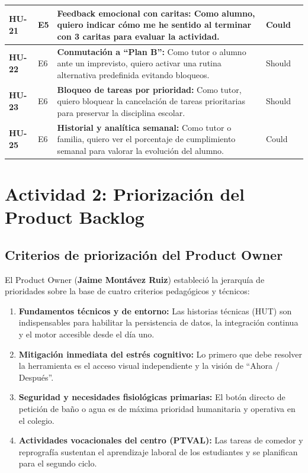 \documentclass[11pt,a4paper]{article}
\begin{document}
{\begin{longtable}{|>{\centering\bfseries\arraybackslash}p{1.3cm}|>{\centering\arraybackslash}p{1.1cm}|>{\raggedright\arraybackslash}p{7.4cm}|>{\centering\arraybackslash}p{1.6cm}|>{\centering\arraybackslash}p{0.8cm}|}
HU-21 & E5 & \textbf{Feedback emocional con caritas:} Como alumno, quiero indicar cómo me he sentido al terminar con 3 caritas para evaluar la actividad. & Could & 2 \\ \hline
HU-22 & E6 & \textbf{Conmutación a ``Plan B'':} Como tutor o alumno ante un imprevisto, quiero activar una rutina alternativa predefinida evitando bloqueos. & Should & 5 \\ \hline
HU-23 & E6 & \textbf{Bloqueo de tareas por prioridad:} Como tutor, quiero bloquear la cancelación de tareas prioritarias para preservar la disciplina escolar. & Should & 3 \\ \hline
HU-25 & E6 & \textbf{Historial y analítica semanal:} Como tutor o familia, quiero ver el porcentaje de cumplimiento semanal para valorar la evolución del alumno. & Could & 3 \\ \hline
\end{longtable}}

\section{Actividad 2: Priorización del Product Backlog}
\subsection{Criterios de priorización del Product Owner}
El Product Owner (\textbf{Jaime Montávez Ruiz}) estableció la jerarquía de prioridades sobre la base de cuatro criterios pedagógicos y técnicos:

\begin{enumerate}[leftmargin=1.6em,itemsep=2pt]
\item \textbf{Fundamentos técnicos y de entorno:} Las historias técnicas (HUT) son indispensables para habilitar la persistencia de datos, la integración continua y el motor accesible desde el día uno.
\item \textbf{Mitigación inmediata del estrés cognitivo:} Lo primero que debe resolver la herramienta es el acceso visual independiente y la visión de ``Ahora / Después''.
\item \textbf{Seguridad y necesidades fisiológicas primarias:} El botón directo de petición de baño o agua es de máxima prioridad humanitaria y operativa en el colegio.
\item \textbf{Actividades vocacionales del centro (PTVAL):} Las tareas de comedor y reprografía sustentan el aprendizaje laboral de los estudiantes y se planifican para el segundo ciclo.
\end{enumerate}
\end{document}
